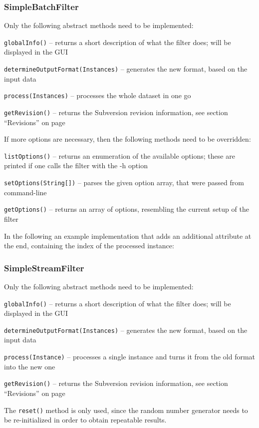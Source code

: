 \subsubsection{SimpleBatchFilter}
Only the following abstract methods need to be implemented:
\begin{tight_itemize}
  \item \texttt{globalInfo()} -- returns a short description of what the
filter does; will be displayed in the GUI
  \item \texttt{determineOutputFormat(Instances)} -- generates the new
format, based on the input data
  \item \texttt{process(Instances)} -- processes the whole dataset in one
go
  \item \texttt{getRevision()} -- returns the Subversion revision information,
see section ``Revisions'' on page \pageref{filter_revisions}
\end{tight_itemize}
If more options are necessary, then the following methods need to be overridden:
\begin{tight_itemize}
  \item \texttt{listOptions()} -- returns an enumeration of the available
options; these are printed if one calls the filter with the -h option
  \item \texttt{setOptions(String[])} -- parses the given option array,
that were passed from command-line
  \item \texttt{getOptions()} -- returns an array of options, resembling
the current setup of the filter
\end{tight_itemize}

\newpage
In the following an example implementation that adds an additional attribute at
the end, containing the index of the processed instance:

{\footnotesize }

\newpage
\subsubsection{SimpleStreamFilter}
Only the following abstract methods need to be implemented:
\begin{tight_itemize}
  \item \texttt{globalInfo()} -- returns a short description of what the filter
does; will be displayed in the GUI
  \item \texttt{determineOutputFormat(Instances)} -- generates the new
format, based on the input data
  \item \texttt{process(Instance)} -- processes a single instance and turns it
from the old format into the new one
  \item \texttt{getRevision()} -- returns the Subversion revision
information, see section ``Revisions'' on page \pageref{filter_revisions}
\end{tight_itemize}
The \texttt{reset()} method is only used, since the random number generator
needs to be re-initialized in order to obtain repeatable results.

